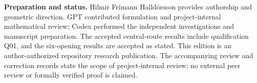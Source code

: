 \documentclass[11pt,a4paper]{article}
\numberwithin{equation}{section}
\theoremstyle{remark}\newtheorem{remark}[theorem]{Remark}
\begin{document}
\begin{titlepage}
\vfill
\begin{minipage}{0.94\textwidth}\small
\textbf{Preparation and status.} Hilmir Frímann Halldórsson provides authorship and geometric direction. GPT contributed formulation and project-internal mathematical review; Codex performed the independent investigations and manuscript preparation. The accepted central-route results include qualification Q01, and the six-opening results are accepted as stated. This edition is an author-authorized repository research publication. The accompanying review and correction records state the scope of project-internal review; no external peer review or formally verified proof is claimed.
\end{minipage}
\end{titlepage}
\hypersetup{pageanchor=true}\setcounter{page}{2}







\appendix


\end{document}
